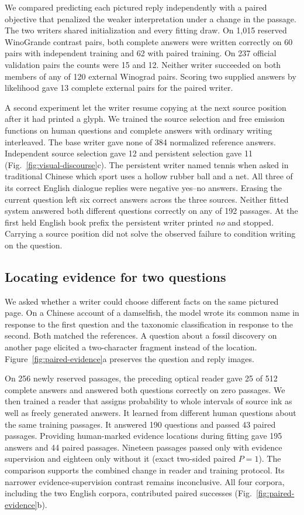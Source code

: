 \documentclass[12pt,a4paper]{article}
\providecommand{\DIFadd}[1]{{\protect\color{blue} \sf #1}} %
\begin{document}
\DIFadd{We compared predicting each pictured reply independently with a paired objective that penalized the weaker interpretation under a change in the passage. The two writers shared initialization and every fitting draw. On 1,015 reserved WinoGrande contrast pairs, both complete answers were written correctly on 60 pairs with independent training and 62 with paired training. On 237 official validation pairs the counts were 15 and 12. Neither writer succeeded on both members of any of 120 external Winograd pairs. Scoring two supplied answers by likelihood gave 13 complete external pairs for the paired writer.
}

\DIFadd{A second experiment let the writer resume copying at the next source position after it had printed a glyph. We trained the source selection and free emission functions on human questions and complete answers with ordinary writing interleaved. The base writer gave none of 384 normalized reference answers. Independent source selection gave 12 and persistent selection gave 11 (Fig.~\ref{fig:visual-discourse}c). The persistent writer named tennis when asked in traditional Chinese which sport uses a hollow rubber ball and a net. All three of its correct English dialogue replies were negative yes--no answers. Erasing the current question left six correct answers across the three sources. Neither fitted system answered both different questions correctly on any of 192 passages. At the first held English book prefix the persistent writer printed \emph{no} and stopped. Carrying a source position did not solve the observed failure to condition writing on the question.
}

\subsection*{\DIFadd{Locating evidence for two questions}}
\DIFadd{We asked whether a writer could choose different facts on the same pictured page. On a Chinese account of a damselfish, the model wrote its common name in response to the first question and the taxonomic classification in response to the second. Both matched the references. A question about a fossil discovery on another page elicited a two-character fragment instead of the location. Figure~\ref{fig:paired-evidence}a preserves the question and reply images.
}

\DIFadd{On 256 newly reserved passages, the preceding optical reader gave 25 of 512 complete answers and answered both questions correctly on zero passages. We then trained a reader that assigns probability to whole intervals of source ink as well as freely generated answers. It learned from different human questions about the same training passages. It answered 190 questions and passed 43 paired passages. Providing human-marked evidence locations during fitting gave 195 answers and 44 paired passages. Nineteen passages passed only with evidence supervision and eighteen only without it (exact two-sided paired $P=1$). The comparison supports the combined change in reader and training protocol. Its narrower evidence-supervision contrast remains inconclusive. All four corpora, including the two English corpora, contributed paired successes (Fig.~\ref{fig:paired-evidence}b).
}
\end{document}
